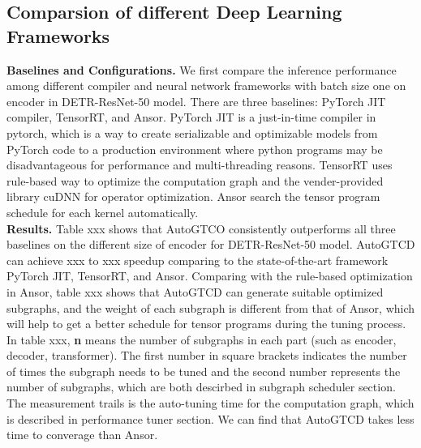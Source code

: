\subsection{Comparsion of different Deep Learning Frameworks}
\textbf{Baselines and Configurations.} We first compare the inference performance among different compiler and neural network frameworks with batch size one on encoder in DETR-ResNet-50 model. 
There are three baselines: PyTorch JIT compiler, TensorRT, and Ansor. PyTorch JIT is a just-in-time compiler in pytorch, which is a way to create serializable and optimizable models from PyTorch code to a production environment where python
programs may be disadvantageous for performance and multi-threading reasons. TensorRT uses rule-based way to optimize the computation graph and the vender-provided library cuDNN for operator optimization. Ansor search the tensor program schedule for each kernel automatically. \\
\textbf{Results.} Table xxx shows that AutoGTCO consistently outperforms all three baselines on the different size of encoder for DETR-ResNet-50 model. AutoGTCD can achieve 
xxx to xxx speedup comparing to the state-of-the-art framework PyTorch JIT, TensorRT, and Ansor. Comparing with the rule-based optimization in Ansor, table xxx shows that AutoGTCD can generate suitable optimized subgraphs, and the weight of each subgraph is different from that of Ansor, which will help
to get a better schedule for tensor programs during the tuning process. In table xxx, \textbf{n} means the number of subgraphs in each part (such as encoder, decoder, transformer). The first number in square brackets indicates the number of times the subgraph needs to be tuned and the second number represents the number of subgraphs, which are both descirbed in subgraph scheduler section. The measurement trails is the auto-tuning time for the computation graph, which is described in performance tuner section. We can find that AutoGTCD takes less time to converage than Ansor.\\


